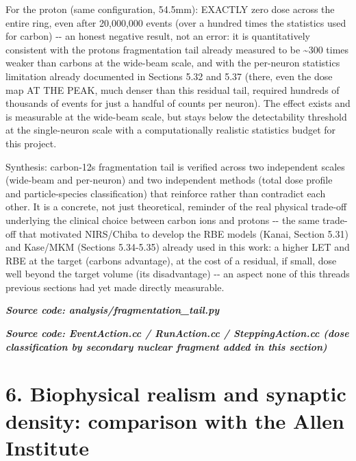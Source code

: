 \documentclass[
  english,
]{article}
\newcounter{none} %
\begin{document}
For the proton (same configuration, 54.5mm): EXACTLY zero dose across the entire ring, even after 20,000,000 events (over a hundred times the statistics used for carbon) -\/- an honest negative result, not an error: it is quantitatively consistent with the proton\textquotesingle s fragmentation tail already measured to be \textasciitilde300 times weaker than carbon\textquotesingle s at the wide-beam scale, and with the per-neuron statistics limitation already documented in Sections 5.32 and 5.37 (there, even the dose map AT THE PEAK, much denser than this residual tail, required hundreds of thousands of events for just a handful of counts per neuron). The effect exists and is measurable at the wide-beam scale, but stays below the detectability threshold at the single-neuron scale with a computationally realistic statistics budget for this project.

Synthesis: carbon-12\textquotesingle s fragmentation tail is verified across two independent scales (wide-beam and per-neuron) and two independent methods (total dose profile and particle-species classification) that reinforce rather than contradict each other. It is a concrete, not just theoretical, reminder of the real physical trade-off underlying the clinical choice between carbon ions and protons -\/- the same trade-off that motivated NIRS/Chiba to develop the RBE models (Kanai, Section 5.31) and Kase/MKM (Sections 5.34-5.35) already used in this work: a higher LET and RBE at the target (carbon\textquotesingle s advantage), at the cost of a residual, if small, dose well beyond the target volume (its disadvantage) -\/- an aspect none of this thread\textquotesingle s previous sections had yet made directly measurable.

\textit{\textbf{Source code: analysis/fragmentation\_\allowbreak{}tail.py}}


\textit{\textbf{Source code: EventAction.cc / RunAction.cc / SteppingAction.cc (dose classification by secondary nuclear fragment added in this section)}}




\section{6. Biophysical realism and synaptic density: comparison with the Allen Institute}\label{biophysical-realism-and-synaptic-density-comparison-with-the-allen-institute}
\end{document}
